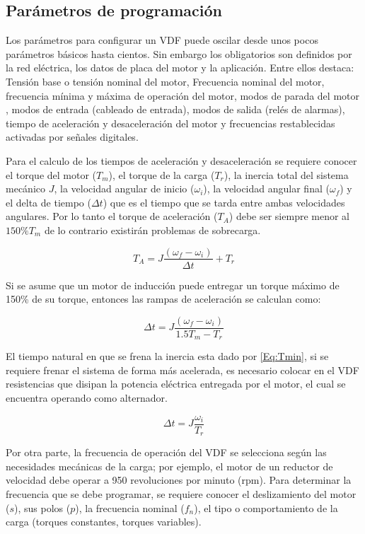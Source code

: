 \subsection{Parámetros de programación}

 Los parámetros para configurar un VDF puede oscilar desde unos pocos parámetros básicos hasta cientos. Sin embargo los obligatorios son definidos por la red eléctrica, los datos de placa del motor y la aplicación. Entre ellos destaca: Tensión base o tensión nominal del motor, Frecuencia nominal del motor, frecuencia mínima y máxima de operación del motor,  modos de parada del motor , modos de entrada (cableado de entrada), modos de salida (relés de alarmas), tiempo de aceleración y desaceleración del motor y frecuencias restablecidas activadas por señales digitales.
 
Para el calculo de los  tiempos de aceleración y desaceleración se requiere conocer el torque del motor ($T_m$), el torque de la carga ($T_r$), la inercia total del sistema mecánico $J$, la velocidad angular  de inicio ($\omega_i$),  la velocidad angular final ($\omega_f$) y el delta de tiempo ($\Delta t$) que es el tiempo que se tarda entre ambas velocidades angulares. Por lo tanto el torque de aceleración ($T_A$) debe ser siempre menor al $150\% T_m$ de lo contrario existirán problemas de sobrecarga.

\begin{equation}
T_A=J\dfrac{(\omega_f-\omega_i)}{\Delta t} + T_r
\end{equation}

Si se asume que un motor de inducción  puede entregar un torque máximo de 150\% de su torque, entonces  las rampas de aceleración se calculan como:

\begin{equation}
\Delta t=J\dfrac{(\omega_f-\omega_i)}{1.5 T_m-T_r}
\end{equation}
 
 El tiempo natural en que se frena la inercia esta dado por \eqref{Eq:Tmin}, si se requiere frenar el sistema de forma más acelerada, es necesario colocar en el VDF resistencias que disipan la potencia eléctrica entregada por el motor, el cual se encuentra operando como alternador.
 
 \begin{equation}
 \Delta t=J\dfrac{\omega_i}{T_r}
 \label{Eq:Tmin}
 \end{equation}
 
 Por otra parte, la frecuencia de operación del VDF se selecciona según las necesidades mecánicas de la carga; por ejemplo, el motor de un reductor de velocidad debe operar a 950 revoluciones por minuto (rpm). Para determinar la frecuencia  que se debe programar, se requiere conocer el deslizamiento del motor ($s$), sus polos ($p$), la frecuencia nominal ($f_n$), el tipo o comportamiento de la carga (torques constantes, torques variables).
 
